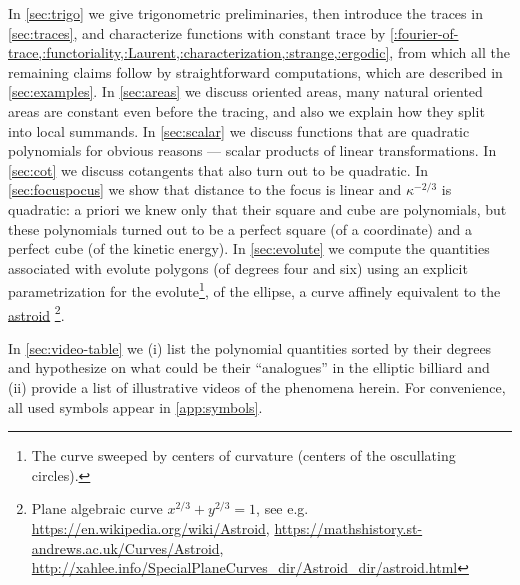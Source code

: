 In \cref{sec:trigo}
we give trigonometric preliminaries,
then introduce the traces
in \cref{sec:traces},
and characterize functions with constant trace
by \cref{:fourier-of-trace,:functoriality,:Laurent,:characterization,:strange,:ergodic},
from which all the remaining claims follow by straightforward computations,
which are described in \cref{sec:examples}.
In \eqref{sec:areas} we discuss oriented areas,
many natural oriented areas are constant even before the tracing,
and also we explain how they split into local summands.
In \eqref{sec:scalar} we discuss functions that are quadratic polynomials for obvious reasons --- scalar products of linear transformations.
In \eqref{sec:cot} we discuss cotangents that also turn out to be quadratic.
In \eqref{sec:focuspocus} we show that distance to the focus is linear
and $κ^{-2/3}$ is quadratic: a priori we knew only that their square and cube are polynomials,
but these polynomials turned out to be
a perfect square (of a coordinate)
and a perfect cube (of the kinetic energy).
In \eqref{sec:evolute} we compute the quantities
associated with evolute polygons (of degrees four and six)
using an explicit parametrization
for the evolute\footnote{The curve sweeped by centers of curvature (centers of the oscullating circles).},
of the ellipse, a curve affinely equivalent to the \href{https://en.wikipedia.org/wiki/Astroid}{astroid}
\footnote{Plane algebraic curve $x^{2/3}+y^{2/3}=1$,
see e.g. \url{https://en.wikipedia.org/wiki/Astroid},
\url{https://mathshistory.st-andrews.ac.uk/Curves/Astroid},
\url{http://xahlee.info/SpecialPlaneCurves_dir/Astroid_dir/astroid.html}}.

In \cref{sec:video-table} we (i) 
list the polynomial quantities sorted by their degrees
and hypothesize on what could be their ``analogues'' in the elliptic billiard
and (ii) provide a list of illustrative videos of the phenomena herein.
For convenience, all used symbols appear in \cref{app:symbols}.



